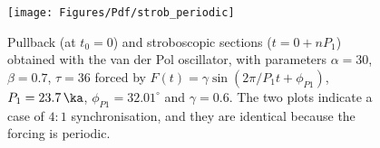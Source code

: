 \begin{figure}
\texttt{[image: Figures/Pdf/strob\_periodic]}
\caption
{
Pullback (at $t_0=0$) and stroboscopic sections ($t=0 + nP_1$) obtained  with the van der Pol oscillator, with parameters $\alpha=30$, $\beta=0.7$, $\tau=36$ forced by $F(t)=\gamma \sin(2\pi/P_1 t + \phi_{P1})$, $P_1=23.7\,\ka$, $\phi_{P1}=32.01^\circ$ and $\gamma=0.6$. The two plots indicate a case of $4:1$ synchronisation, and they are identical because the forcing is periodic.
}
\label{fig:strob_periodic}
\end{figure}
